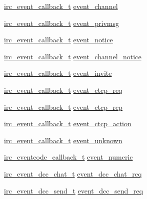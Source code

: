 \begin{CompactItemize}
\item 
\hyperlink{libirc__events_8h_c472d3e37df8f172fed3d75e649fac14}{irc\_\-event\_\-callback\_\-t} \hyperlink{structirc__callbacks__t_87d4401073ce8dba9a43fcbcaa20d341}{event\_\-channel}
\item 
\hyperlink{libirc__events_8h_c472d3e37df8f172fed3d75e649fac14}{irc\_\-event\_\-callback\_\-t} \hyperlink{structirc__callbacks__t_f0fe4e42f9d675f0d844fc3c58b2dc5d}{event\_\-privmsg}
\item 
\hyperlink{libirc__events_8h_c472d3e37df8f172fed3d75e649fac14}{irc\_\-event\_\-callback\_\-t} \hyperlink{structirc__callbacks__t_92a5b22ba900f06fa04ea9e79462ffc6}{event\_\-notice}
\item 
\hyperlink{libirc__events_8h_c472d3e37df8f172fed3d75e649fac14}{irc\_\-event\_\-callback\_\-t} \hyperlink{structirc__callbacks__t_ce284026a0e082bcdc13a6dae26dd90b}{event\_\-channel\_\-notice}
\item 
\hyperlink{libirc__events_8h_c472d3e37df8f172fed3d75e649fac14}{irc\_\-event\_\-callback\_\-t} \hyperlink{structirc__callbacks__t_e5f3325ab13c3a36ed84435e3bcf7b61}{event\_\-invite}
\item 
\hyperlink{libirc__events_8h_c472d3e37df8f172fed3d75e649fac14}{irc\_\-event\_\-callback\_\-t} \hyperlink{structirc__callbacks__t_5f5d386a4df0d1334ffb96b3c406355f}{event\_\-ctcp\_\-req}
\item 
\hyperlink{libirc__events_8h_c472d3e37df8f172fed3d75e649fac14}{irc\_\-event\_\-callback\_\-t} \hyperlink{structirc__callbacks__t_1e967e7534502bce5434dd4d4415bdd8}{event\_\-ctcp\_\-rep}
\item 
\hyperlink{libirc__events_8h_c472d3e37df8f172fed3d75e649fac14}{irc\_\-event\_\-callback\_\-t} \hyperlink{structirc__callbacks__t_522d1cf8dc01b66efc03d31e3787e11f}{event\_\-ctcp\_\-action}
\item 
\hyperlink{libirc__events_8h_c472d3e37df8f172fed3d75e649fac14}{irc\_\-event\_\-callback\_\-t} \hyperlink{structirc__callbacks__t_765b4f0a622cedf2c26c1a615414a3a4}{event\_\-unknown}
\item 
\hyperlink{libirc__events_8h_b6000d309e87cfb727dcad0136fcb79f}{irc\_\-eventcode\_\-callback\_\-t} \hyperlink{structirc__callbacks__t_85951d45acff22aea37a822bb9c7aef7}{event\_\-numeric}
\item 
\hyperlink{libirc__events_8h_8c3ddaa55e5ded002b5054f0b926381c}{irc\_\-event\_\-dcc\_\-chat\_\-t} \hyperlink{structirc__callbacks__t_fbaf019778a64b544093ee29da5b3c81}{event\_\-dcc\_\-chat\_\-req}
\item 
\hyperlink{libirc__events_8h_5f4b1d95f2d6619041f993ba748544cf}{irc\_\-event\_\-dcc\_\-send\_\-t} \hyperlink{structirc__callbacks__t_2ac9d08921faee2472ed16d41799887d}{event\_\-dcc\_\-send\_\-req}
\end{CompactItemize}


